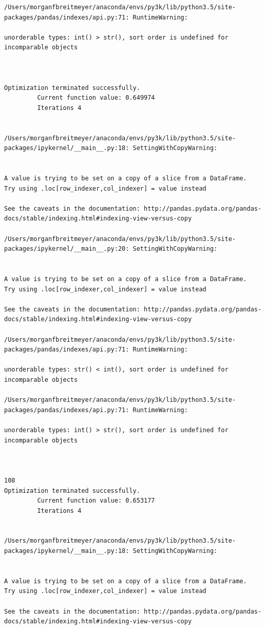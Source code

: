 \begin{lstlisting}
/Users/morganfbreitmeyer/anaconda/envs/py3k/lib/python3.5/site-packages/pandas/indexes/api.py:71: RuntimeWarning:

unorderable types: int() > str(), sort order is undefined for incomparable objects



Optimization terminated successfully.
         Current function value: 0.649974
         Iterations 4


/Users/morganfbreitmeyer/anaconda/envs/py3k/lib/python3.5/site-packages/ipykernel/__main__.py:18: SettingWithCopyWarning:


A value is trying to be set on a copy of a slice from a DataFrame.
Try using .loc[row_indexer,col_indexer] = value instead

See the caveats in the documentation: http://pandas.pydata.org/pandas-docs/stable/indexing.html#indexing-view-versus-copy

/Users/morganfbreitmeyer/anaconda/envs/py3k/lib/python3.5/site-packages/ipykernel/__main__.py:20: SettingWithCopyWarning:


A value is trying to be set on a copy of a slice from a DataFrame.
Try using .loc[row_indexer,col_indexer] = value instead

See the caveats in the documentation: http://pandas.pydata.org/pandas-docs/stable/indexing.html#indexing-view-versus-copy

/Users/morganfbreitmeyer/anaconda/envs/py3k/lib/python3.5/site-packages/pandas/indexes/api.py:71: RuntimeWarning:

unorderable types: str() < int(), sort order is undefined for incomparable objects

/Users/morganfbreitmeyer/anaconda/envs/py3k/lib/python3.5/site-packages/pandas/indexes/api.py:71: RuntimeWarning:

unorderable types: int() > str(), sort order is undefined for incomparable objects



108
Optimization terminated successfully.
         Current function value: 0.653177
         Iterations 4


/Users/morganfbreitmeyer/anaconda/envs/py3k/lib/python3.5/site-packages/ipykernel/__main__.py:18: SettingWithCopyWarning:


A value is trying to be set on a copy of a slice from a DataFrame.
Try using .loc[row_indexer,col_indexer] = value instead

See the caveats in the documentation: http://pandas.pydata.org/pandas-docs/stable/indexing.html#indexing-view-versus-copy


\end{lstlisting}
